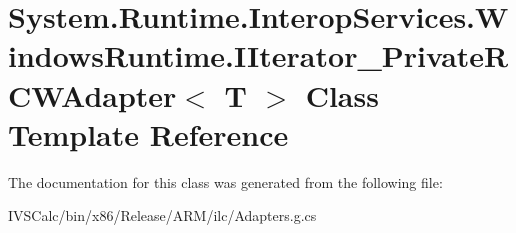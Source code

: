 \hypertarget{class_system_1_1_runtime_1_1_interop_services_1_1_windows_runtime_1_1_i_iterator___private_r_c_w_adapter}{}\section{System.\+Runtime.\+Interop\+Services.\+Windows\+Runtime.\+I\+Iterator\+\_\+\+Private\+R\+C\+W\+Adapter$<$ T $>$ Class Template Reference}
\label{class_system_1_1_runtime_1_1_interop_services_1_1_windows_runtime_1_1_i_iterator___private_r_c_w_adapter}


The documentation for this class was generated from the following file\+:\begin{DoxyCompactItemize}
\item 
I\+V\+S\+Calc/bin/x86/\+Release/\+A\+R\+M/ilc/Adapters.\+g.\+cs\end{DoxyCompactItemize}
